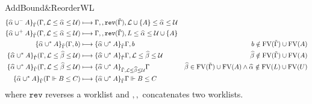 \documentclass{article}
\theoremstyle{definition}
\begin{document}
\clearpage
\newpage
\phantom{}

\begin{figure}[!t]
{\small 
\phantom{phantom} \hfill {} \hfill AddBound\&ReorderWL
 $$\begin{aligned}
 \{\al\cup^-A\}_{\tilde\Gamma} (\Gamma, \mathcal{L}\le\al\le\mathcal{U}) &\longmapsto \Gamma,, \texttt{rev}({\tilde\Gamma}), \mathcal{L}\cup\{A\}\le \al\le\mathcal{U}&  \\
 \{\al\cup^+A\}_{\tilde\Gamma}(\Gamma, \mathcal{L}\le\al\le\mathcal{U}) &\longmapsto \Gamma,, \texttt{rev}({\tilde\Gamma}), L\le \al\le\mathcal{U}\cup\{A\}& \\
 \{\al\cup^*A\}_{\tilde\Gamma} (\Gamma, b) &\longmapsto \{\al\cup^*A\}_{\tilde\Gamma}\Gamma, b \qquad &b \notin \text{FV}(\tilde\Gamma)\cup\text{FV}(A) \\
  \{\al\cup^*A\}_{\tilde\Gamma} (\Gamma, \mathcal{L}\le\bt\le\mathcal{U}) &\longmapsto \{\al\cup^*A\}_{\tilde\Gamma}\Gamma, \mathcal{L}\le\bt\le\mathcal{U}  &\bt \notin \text{FV}(\tilde\Gamma)\cup\text{FV}(A) \\
  \{\al\cup^*A\}_{\tilde\Gamma} (\Gamma, \mathcal{L}\le\bt\le\mathcal{U}) &\longmapsto \{\al\cup^* A\}_{\tilde\Gamma, \mathcal{L}\le \bt\le\mathcal{U}}\Gamma  &\bt \in \text{FV}(\tilde\Gamma)\cup\text{FV}(A) \wedge \al \notin \text{FV}(L)\cup\text{FV}(U) \\
  \{\al\cup^*A\}_{\tilde\Gamma} (\Gamma\Vdash B\le C) &\longmapsto \{\al\cup^*A\}_{\tilde\Gamma}\Gamma\Vdash B\le C  & \\
\end{aligned}
$$
} 
where $\texttt{rev}$ reverses a worklist and $,,$ concatenates two worklists.

\end{figure}
\end{document}
